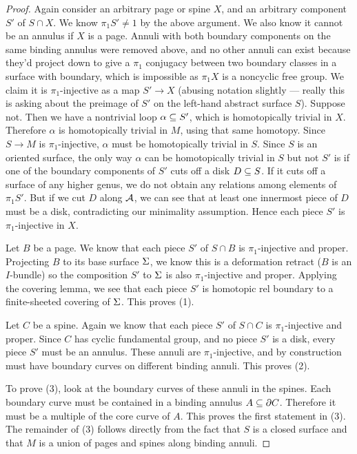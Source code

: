 \begin{proof}
Again consider an arbitrary page or spine $X$, and an arbitrary component $S'$
of $S \cap X$.  We know $\pi_1S' \neq 1$ by the above argument. We also know it
cannot be an annulus if $X$ is a page. Annuli with both boundary components on
the same binding annulus were removed above, and no other annuli can exist
because they'd project down to give a $\pi_1$ conjugacy between two boundary
classes in a surface with boundary, which is impossible as $\pi_1X$ is
a noncyclic free group.  We claim it is $\pi_1$-injective as a map $S' \to X$
(abusing notation slightly --- really this is asking about the preimage of $S'$
on the left-hand abstract surface $S$).  Suppose not. Then we have a nontrivial
loop $\alpha \subseteq S'$, which is homotopically trivial in $X$.  Therefore
$\alpha$ is homotopically trivial in $M$, using that same homotopy.  Since $S
\to M$ is $\pi_1$-injective, $\alpha$ must be homotopically trivial in $S$.
Since $S$ is an oriented surface, the only way $\alpha$ can be homotopically
trivial in $S$ but not $S'$ is if one of the boundary components of $S'$ cuts
off a disk $D \subseteq S$. If it cuts off a surface of any higher genus, we do not
obtain any relations among elements of $\pi_1S'$.  But if we cut $D$ along
$\mathcal{A}$, we can see that at least one innermost piece of $D$ must be a disk,
contradicting our minimality assumption.  Hence each piece $S'$ is
$\pi_1$-injective in $X$.

Let $B$ be a page. We know that each piece $S'$ of $S \cap B$ is
$\pi_1$-injective and proper. Projecting $B$ to its base surface $\Sigma$, we know
this is a deformation retract ($B$ is an $I$-bundle) so the composition $S'$ to
$\Sigma$ is also $\pi_1$-injective and proper. Applying the covering lemma, we see
that each piece $S'$ is homotopic rel boundary to a finite-sheeted covering of
$\Sigma$.  This proves (1).

Let $C$ be a spine. Again we know that each piece $S'$ of $S \cap C$ is
$\pi_1$-injective and proper. Since $C$ has cyclic fundamental group, and no
piece $S'$ is a disk, every piece $S'$ must be an annulus. These annuli are
$\pi_1$-injective, and by construction must have boundary curves on different
binding annuli.  This proves (2).

To prove (3), look at the boundary curves of these annuli in the spines. Each
boundary curve must be contained in a binding annulus $A \subseteq \partial C$. Therefore
it must be a multiple of the core curve of $A$. This proves the first statement
in (3). The remainder of (3) follows directly from the fact that $S$ is
a closed surface and that $M$ is a union of pages and spines along binding
annuli.

\end{proof}

